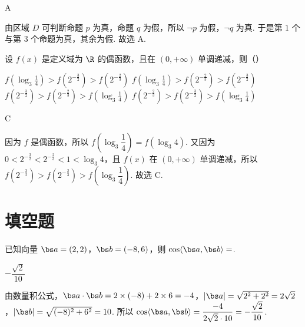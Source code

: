 \begin{answer}
A
\end{answer}

\begin{solution}
由区域 \(D\) 可判断命题 \(p\) 为真，命题 \(q\) 为假，所以 \(\neg p\) 为假，\(\neg q\) 为真. 于是第 \(1\) 个与第 \(3\) 个命题为真，其余为假. 故选 A.
\end{solution}

\begin{problem}
设 \(f(x)\) 是定义域为 \(\R\) 的偶函数，且在 \((0,+\infty)\) 单调递减，则（\quad）

\choices
    {\(f\!\left(\log_3\frac14\right)>f\!\left(2^{-\frac{3}{2}}\right)>f\!\left(2^{-\frac{2}{3}}\right)\)}
    {\(f\!\left(\log_3\frac14\right)>f\!\left(2^{-\frac{2}{3}}\right)>f\!\left(2^{-\frac{3}{2}}\right)\)}
    {\(f\!\left(2^{-\frac{3}{2}}\right)>f\!\left(2^{-\frac{2}{3}}\right)>f\!\left(\log_3\frac14\right)\)}
    {\(f\!\left(2^{-\frac{2}{3}}\right)>f\!\left(2^{-\frac{3}{2}}\right)>f\!\left(\log_3\frac14\right)\)}
\end{problem}

\begin{answer}
C
\end{answer}

\begin{solution}
因为 \(f\) 是偶函数，所以 \(f\!\left(\log_3\dfrac14\right)=f\!\left(\log_3 4\right)\). 又因为 \(0<2^{-\frac{3}{2}}<2^{-\frac{2}{3}}<1<\log_3 4\)，且 \(f(x)\) 在 \((0,+\infty)\) 单调递减，所以 \(f\!\left(2^{-\frac{3}{2}}\right)>f\!\left(2^{-\frac{2}{3}}\right)>f\!\left(\log_3\dfrac14\right)\). 故选 C.
\end{solution}

\section{填空题}

\begin{problem}
已知向量 \(\bs a=(2,2)\)，\(\bs b=(-8,6)\)，则 \(\cos\langle\bs a,\bs b\rangle=\)\fillinblank{}.
\end{problem}

\begin{answer}
\(-\dfrac{\sqrt2}{10}\)
\end{answer}

\begin{solution}
由数量积公式，\(\bs a\cdot\bs b=2\times(-8)+2\times6=-4\)，\(|\bs a|=\sqrt{2^2+2^2}=2\sqrt2\)，\(|\bs b|=\sqrt{(-8)^2+6^2}=10\). 所以 \(\cos\langle\bs a,\bs b\rangle=\dfrac{-4}{2\sqrt2\cdot10}=-\dfrac{\sqrt2}{10}\).
\end{solution}

